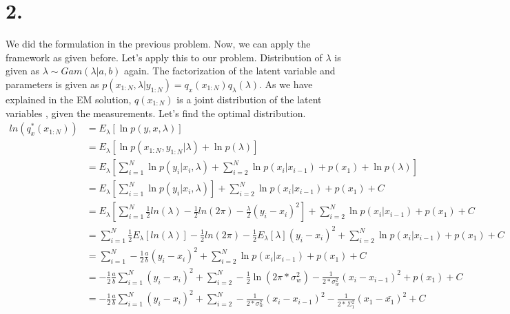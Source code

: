 \documentclass{article}
\begin{document}
\section*{2.}
We did the formulation in the previous problem. Now, we can apply the framework as given before.
Let's apply this to our problem. Distribution of $\lambda$ is given as $\lambda \sim Gam(\lambda|a,b)$ again. The factorization of the latent variable and parameters is 
given as $p(x_{1:N},\lambda|y_{1:N}) = q_x(x_{1:N})q_\lambda(\lambda)$. As we have explained in the EM solution, $q(x_{1:N})$ is a joint distribution of the latent variables
, given the measurements. Let's find the optimal distribution. 
\[
    \begin{aligned}
        ln(q_x^*(x_{1:N}))  &= E_{\lambda}\left[ \ln p(y,x,\lambda) \right] \\
                            &= E_{\lambda}\left[ \ln p(x_{1:N},y_{1:N}|\lambda) + \ln p(\lambda) \right] \\
                            &= E_{\lambda}\left[ \sum_{i=1}^{N} \ln p(y_i|x_i,\lambda) + \sum_{i=2}^{N} \ln p(x_i|x_{i-1}) + p(x_{1}) + \ln p(\lambda) \right] \\
                            &= E_{\lambda}\left[ \sum_{i=1}^{N} \ln p(y_i|x_i,\lambda) \right] + \sum_{i=2}^{N} \ln p(x_i|x_{i-1}) + p(x_{1}) + C\\
                            &= E_{\lambda}\left[ \sum_{i=1}^{N} \frac{1}{2}ln(\lambda) - \frac{1}{2}ln(2\pi) - \frac{\lambda}{2}(y_i - x_i)^2 \right] + \sum_{i=2}^{N} \ln p(x_i|x_{i-1}) + p(x_{1}) + C\\
                            &= \sum_{i=1}^{N} \frac{1}{2}E_{\lambda}\left[ ln(\lambda) \right] - \frac{1}{2}ln(2\pi) - \frac{1}{2}E_{\lambda}\left[ \lambda \right](y_i - x_i)^2 + \sum_{i=2}^{N} \ln p(x_i|x_{i-1}) + p(x_{1}) + C\\
                            &= \sum_{i=1}^{N} - \frac{1}{2}\frac{a}{b}(y_i - x_i)^2 + \sum_{i=2}^{N} \ln p(x_i|x_{i-1}) + p(x_{1}) + C\\
                            &= - \frac{1}{2}\frac{a}{b}\sum_{i=1}^{N}(y_i - x_i)^2 + \sum_{i=2}^{N} - \frac{1}{2}\ln(2\pi*\sigma_w^2) - \frac{1}{2*\sigma_w^2}(x_i - x_{i-1})^2 + p(x_{1}) + C\\
                            &= - \frac{1}{2}\frac{a}{b}\sum_{i=1}^{N}(y_i - x_i)^2 + \sum_{i=2}^{N} - \frac{1}{2*\sigma_w^2}(x_i - x_{i-1})^2 - \frac{1}{2*\Sigma_{1}^2}(x_1 - \bar{x_{1}})^2 + C\\
    \end{aligned}
\]
\end{document}
